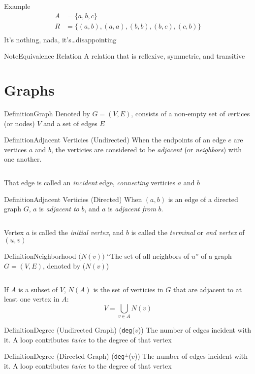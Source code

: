 \documentclass{MathNotes}
\newenvironment{example}[1]{\begin{BlueBox}{Example}{#1}}{\end{BlueBox}}
\newenvironment{definition}[1]{\begin{RedBox}{Definition}{#1}}{\end{RedBox}}
\newenvironment{note}[1]{\begin{YellowBox}{Note}{#1}}{\end{YellowBox}}
\newcommand{\bl}{
	\newline$ $\newline
}
\begin{document}
\begin{example}{}
	\begin{align*}
		A & = \{a,b,c\}                         \\
		R & = \{(a,b),(a,a),(b,b),(b,c),(c,b)\} \\
	\end{align*}
	It's nothing, nada, it's\ldots disappointing
\end{example}

\begin{note}{Equivalence Relation}
	A relation that is reflexive, symmetric, and transitive
\end{note}

\newpage
\section{Graphs}
\begin{definition}{Graph}
	Denoted by $G=(V,E)$, consists of a non-empty set of \textit vertices (or nodes) $V$ and a set of edges $E$
\end{definition}
\begin{multicols}{2}
	\begin{definition}{Adjacent Verticies (Undirected)}
		When the endpoints of an edge $e$ are vertices $a$ and $b$, the verticies
		are considered to be \textit{adjacent} (or \textit{neighbors}) with one
		another.
		\bl
		That edge is called an \textit{incident} edge, \textit{connecting} verticies
		$a$ and $b$
	\end{definition}
	\begin{definition}{Adjacent Verticies (Directed)}
		When $(a,b)$ is an edge of a directed graph $G$, $a$ is \textit{adjacent to}
		$b$, and $a$ is \textit{adjacent from} $b$.
		\bl
		Vertex $a$ is called the \textit{initial vertex}, and $b$ is called
		the \textit{terminal} or \textit{end vertex} of $(u,v)$
	\end{definition}
\end{multicols}

\begin{definition}{Neighborhood $\big(N(v)\big)$}
	``The set of all neighbors of $u$'' of a graph $G=(V,E)$, denoted by ($N(v)$)
	\bl
	If $A$ is a subset of $V$, $N(A)$ is the set of verticies in $G$ that are
	adjacent to at least one vertex in $A$: \[V=\bigcup_{v\in A}N(v)\]
\end{definition}

\begin{multicols}{2}
	\begin{definition}{Degree (Undirected Graph) \big(\texttt{deg}($v$)\big)}
		The number of edges incident with it. A loop contributes \textit{twice} to
		the degree of that vertex
	\end{definition}
	\begin{definition}{Degree (Directed Graph) \big(\texttt{deg}$^{\pm}$($v$)\big)}
		The number of edges incident with it. A loop contributes \textit{twice} to
		the degree of that vertex
	\end{definition}
\end{multicols}
\end{document}
